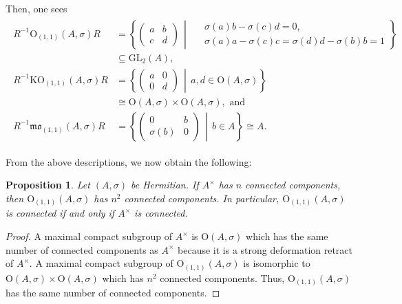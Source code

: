 \documentclass[oneside,11pt]{amsart}
\newtheorem{prop}[thm]{Proposition}
\theoremstyle{definition}
\theoremstyle{remark}
\newcommand{\midwd}{\,\middle\vert\,}
\numberwithin{thm}{section}
\numberwithin{equation}{section}
\begin{document}
Then, one sees
\begin{align}\label{eq:conj_orth}
\begin{aligned}
    R^{-1}\mathrm{O}_{(1,1)}(A,\sigma)R&=\left\{\begin{pmatrix}
    a & b \\
    c & d
    \end{pmatrix}\midwd
    \begin{aligned}
    &\ \sigma(a)b-\sigma(c)d=0,\\
    &\ \sigma(a)a-\sigma(c)c=\sigma(d)d-\sigma(b)b=1
    \end{aligned}\right\}\\[2pt]
    & \subseteq \mathrm{GL}_2(A),\\[2pt]
    R^{-1}\mathrm{KO}_{(1,1)}(A,\sigma)R&=\left\{\begin{pmatrix}
    a & 0 \\
    0 & d
    \end{pmatrix}\midwd a,d\in \mathrm{O}{(A,\sigma)}\right\}\\[2pt]
    & \cong \mathrm O{(A,\sigma)}\times \mathrm O{(A,\sigma)}, \text{ and }\\[2pt]
    R^{-1}\mathfrak{mo}_{(1,1)}(A,\sigma)R&=\left\{\begin{pmatrix}
    0 & b \\
    \sigma(b) & 0
    \end{pmatrix}\midwd b\in A \right\} \cong A.
\end{aligned}
\end{align}

From the above descriptions, we now obtain the following:
\begin{prop}\label{prop:O_(1,1)-connected}
    Let $(A,\sigma)$ be Hermitian. If $A^\times$ has $n$ connected components, then $\mathrm{O}_{(1,1)}(A,\sigma)$ has $n^2$ connected components. In particular, $\mathrm{O}_{(1,1)}(A,\sigma)$ is connected if and only if $A^\times$ is connected.
\end{prop}

\begin{proof}
    A maximal compact subgroup of $A^\times$ is $\mathrm{O}{(A,\sigma)}$ which has the same number of connected components as $A^\times$ because it is a strong deformation retract of $A^\times$. A maximal compact subgroup of $\mathrm{O}_{(1,1)}(A,\sigma)$ is isomorphic to $\mathrm{O}{(A,\sigma)}\times \mathrm{O}{(A,\sigma)}$ which has $n^2$ connected components. Thus, $\mathrm{O}_{(1,1)}(A,\sigma)$ has the same number of connected components.
\end{proof}
\end{document}
